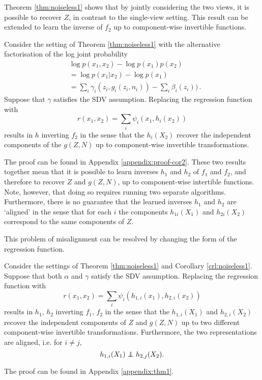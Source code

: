 Theorem \ref{thm:noiseless1} shows that by jointly considering the two views, it is possible to recover $Z$, in contrast to the single-view setting.
This result can be extended to learn the inverse of ${f}_2$ up to component-wise invertible functions.

\medskip

\begin{corollary}
	\label{crl:noiseless1}
	Consider the setting of Theorem \ref{thm:noiseless1} with the alternative factorisation of the log joint probability
	\begin{align}
	&\log p({x}_1, {x}_2) - \log p({x}_1) p({x}_2) \nonumber \\
	&= \log p({x}_1 | {x}_2) - \log p({x}_1)\nonumber \\
	&= \sum_i \gamma_i(z_i, g_i(z_i, n_i)) - \sum_i \beta_i(z_i)) \label{eq:logdens_noiesless_2}\,.
	\end{align}
	Suppose that ${\gamma}$ satisfies the SDV assumption.
	Replacing the regression function with
	\begin{equation*}
	r({x}_{1},{x}_{2})=\sum_{i}\psi_{i}({x}_{1}, h_{i}({x}_{2}))
	\end{equation*}
	results in ${h}$ inverting ${f}_2$ in the sense that the $h_{i}({X}_2)$ recover the independent components of the ${g}({Z}, {N})$ up  to component-wise invertible transformations.
\end{corollary}
The proof can be found in Appendix \ref{appendix:proof-cor2}.
These two results together mean that it is possible to learn inverses ${h}_1$ and ${h}_2$ of ${f}_1$ and ${f}_2$, and therefore to recover ${Z}$ and ${g}({Z}, {N})$, up to component-wise intertible functions.
Note, however, that doing so requires running two separate algorithms.
Furthermore, there is no guarantee that the learned inverses ${h}_1$ and ${h}_2$ are `aligned' in the sense that for each $i$ the components ${h}_{1i}({X}_1)$ and ${h}_{2i}({X}_2)$ correspond to the same components of ${Z}$.

This problem of misalignment can be resolved by changing the form of the regression function.

\medskip

\begin{theorem}\label{thm:demixing}
	Consider the settings of Theorem \ref{thm:noiseless1} and Corollary \ref{crl:noiseless1}.
	Suppose that both ${\alpha}$ and ${\gamma}$ satisfy the SDV assumption.
	Replacing the regression function with
	\begin{equation}\label{eqn:double-regression-fn}
	r({x}_{1},{x}_{2})=\sum_{i}\psi_{i}(h_{1,i}({x}_{1}),h_{2,i}({x}_{2}))
	\end{equation}
	results in ${h}_1$, ${h}_2$ inverting ${f}_1$, ${f}_2$ in the sense that the $h_{1,i}({X}_1)$ and $h_{2,i}({X}_2)$ recover the independent components of ${Z}$ and ${g}({Z}, {N})$ up to two different component-wise invertible transformations. Furthermore, the two representations are aligned, i.e. for $i\not=j$,
	\begin{equation*}
	h_{1,i}({X}_{1})\independent h_{2,j}({X}_{2}).
	\end{equation*}
\end{theorem}
The proof can be found in Appendix \ref{appendix:thm1}.


